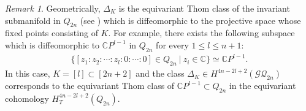 \documentclass[12pt]{amsart}
\theoremstyle{remark}
\newtheorem{remark}{Remark}[section]
\numberwithin{equation}{section}
\begin{document}

\begin{remark}
\label{about_Thom_class}
Geometrically, $\Delta_{K}$ is the equivariant Thom class of the invariant submanifold in $Q_{2n}$ (see \cite{Ma99}) which is diffeomorphic to the projective space whose fixed points consisting of $K$.
For example, there exists the following subspace which is diffeomorphic to $\mathbb{C}P^{l-1}$ in $Q_{2n}$ for every $1\le l\le n+1$:
\begin{align*}
\{[z_{1}:z_{2}:\cdots :z_{l}:0:\cdots:0]\in Q_{2n}\ |\ z_{i}\in \mathbb{C}\}\simeq \mathbb{C}P^{l-1}.
\end{align*}
In this case, $K=[l]\subset [2n+2]$ and 
the class $\Delta_{K}\in H^{4n-2l+2}(\mathcal{GQ}_{2n})$ corresponds to the equivariant Thom class of $\mathbb{C}P^{l-1}\subset Q_{2n}$ in the equivariant cohomology $H_{T}^{4n-2l+2}(Q_{2n})$.
\end{remark}
\end{document}
